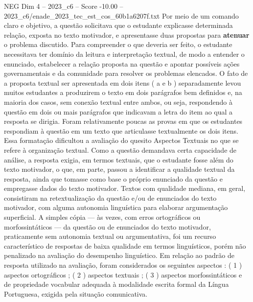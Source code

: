 \begin{textsample}{NEG Dim 4 – 2023\_c6 – Score -10.00 – 2023\_c6/enade\_2023\_tec\_est\_cos\_60b1a6207f.txt}
Por meio de um comando claro e objetivo, a questão solicitava que o estudante explicasse determinada relação, exposta no texto motivador, e apresentasse duas propostas para \textbf{atenuar} o problema discutido.
Para compreender o que deveria ser feito, o estudante necessitava ter domínio da leitura e interpretação textual, de modo a entender o enunciado, estabelecer a relação proposta na questão e apontar possíveis ações governamentais e da comunidade para resolver os problemas elencados.
O fato de a proposta textual ser apresentada em dois itens ( a e b ) separadamente levou muitos estudantes a produzirem o texto em dois parágrafos bem definidos e, na maioria dos casos, sem conexão textual entre ambos, ou seja, respondendo à questão em dois ou mais parágrafos que indicavam a letra do item ao qual a resposta se dirigia.
Foram relativamente poucas as provas em que os estudantes respondiam à questão em um texto que articulasse textualmente os dois itens.
Essa formatação dificultou a avaliação do quesito Aspectos Textuais no que se refere à organização textual.
Como a questão demandava certa capacidade de análise, a resposta exigia, em termos textuais, que o estudante fosse além do texto motivador, o que, em parte, passou a identificar a qualidade textual da resposta, ainda que tomasse como base o próprio enunciado da questão e empregasse dados do texto motivador.
Textos com qualidade mediana, em geral, consistiram na retextualização da questão e/ou de enunciados do texto motivador, com alguma autonomia linguística para elaborar argumentação superficial.
A simples cópia — às vezes, com erros ortográficos ou morfossintáticos — da questão ou de enunciados do texto motivador, praticamente sem autonomia textual ou argumentativa, foi um recurso característico de respostas de baixa qualidade em termos linguísticos, porém não penalizado na avaliação do desempenho linguístico.
Em relação ao padrão de resposta utilizado na avaliação, foram considerados os seguintes aspectos : ( 1 ) aspectos ortográficos ; ( 2 ) aspectos textuais ; ( 3 ) aspectos morfossintáticos e de propriedade vocabular adequada à modalidade escrita formal da Língua Portuguesa, exigida pela situação comunicativa.

\end{textsample}
